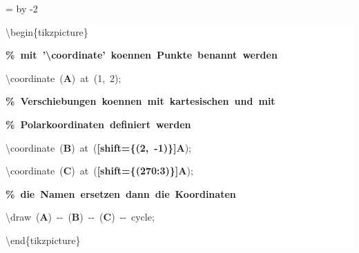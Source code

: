 \begingroup
\ttfamily
{}
=\textwidth
\advance{} by -2\fboxsep
\noindent
\colorbox{background}
{%
\parbox{\dimen255}
{%
\rule[-0.5ex]{0pt}{2.5ex}\hspace*{0.0em}\textbackslash{}begin\{tikzpicture\}\\
\rule[-0.5ex]{0pt}{2.5ex}\hspace*{1.0em}\textcolor{G}{\textbf{\%~mit~'\textbackslash{}coordinate'~koennen~Punkte~benannt~werden}}\\
\rule[-0.5ex]{0pt}{2.5ex}\hspace*{1.0em}\textbackslash{}coordinate~(\textcolor{B}{\textbf{A}})~at~(1,~2);\\
\rule[-0.5ex]{0pt}{2.5ex}\hspace*{1.0em}\textcolor{G}{\textbf{\%~Verschiebungen~koennen~mit~kartesischen~und~mit}}\\
\rule[-0.5ex]{0pt}{2.5ex}\hspace*{1.0em}\textcolor{G}{\textbf{\%~Polarkoordinaten~definiert~werden}}\\
\rule[-0.5ex]{0pt}{2.5ex}\hspace*{1.0em}\textbackslash{}coordinate~(\textcolor{B}{\textbf{B}})~at~(\textcolor{R}{\textbf{[shift=\{(2,~{-}1)\}]}}\textcolor{B}{\textbf{A}});\\
\rule[-0.5ex]{0pt}{2.5ex}\hspace*{1.0em}\textbackslash{}coordinate~(\textcolor{B}{\textbf{C}})~at~(\textcolor{R}{\textbf{[shift=\{(270:3)\}]}}\textcolor{B}{\textbf{A}});\\
\rule[-0.5ex]{0pt}{2.5ex}\hspace*{1.0em}\textcolor{G}{\textbf{\%~die~Namen~ersetzen~dann~die~Koordinaten}}\\
\rule[-0.5ex]{0pt}{2.5ex}\hspace*{1.0em}\textbackslash{}draw~(\textcolor{B}{\textbf{A}})~{-}{-}~(\textcolor{B}{\textbf{B}})~{-}{-}~(\textcolor{B}{\textbf{C}})~{-}{-}~cycle;\\
\rule[-0.5ex]{0pt}{2.5ex}\hspace*{0.0em}\textbackslash{}end\{tikzpicture\}}%
}%
\endgroup
